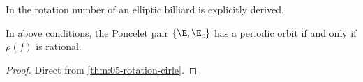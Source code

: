 \begin{remark}
In  \cite{kolod1985} the rotation number of an elliptic billiard  is explicitly derived. %
\end{remark}

 
\begin{corollary} 
In   above conditions, 
the Poncelet pair $\{\E,\E_c\}$ has a  periodic orbit if and only if $\rho(f)$ is rational.
\end{corollary}

 
\begin{proof} Direct from \cref{thm:05-rotation-cirle}.
\end{proof}
